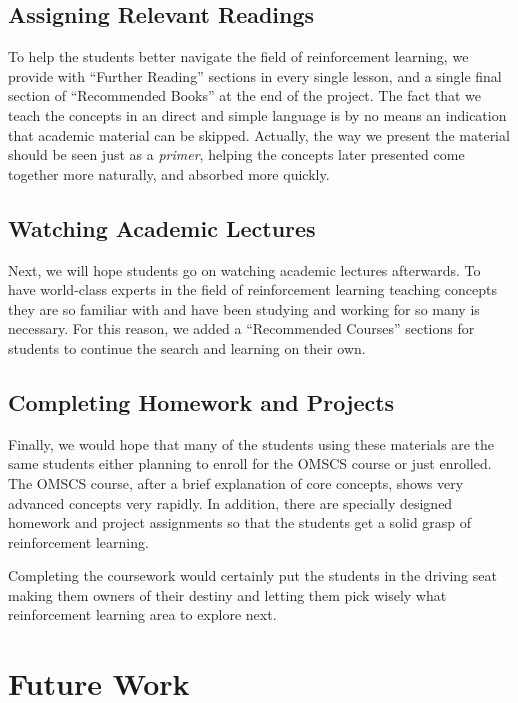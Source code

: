\documentclass[11pt]{article} %
\begin{document}
\subsection{Assigning Relevant Readings}

To help the students better navigate the field of reinforcement learning,
we provide with ``Further Reading'' sections in every single lesson, and a
single final section of ``Recommended Books'' at the end of the project. The fact
that we teach the concepts in an direct and simple language is by no means
an indication that academic material can be skipped. Actually, the way we
present the material should be seen just as a \emph{primer}, helping the
concepts later presented come together more naturally, and absorbed more
quickly.

\subsection{Watching Academic Lectures}

Next, we will hope students go on watching academic lectures afterwards.
To have world-class experts in the field of reinforcement learning teaching
concepts they are so familiar with and have been studying and working for so
many is necessary. For this reason, we added a ``Recommended Courses''
sections for students to continue the search and learning on their own.

\subsection{Completing Homework and Projects}

Finally, we would hope that many of the students using these materials are
the same students either planning to enroll for the OMSCS course or just
enrolled. The OMSCS course, after a brief explanation of core concepts,
shows very advanced concepts very rapidly. In addition, there are specially
designed homework and project assignments so that the students get a solid
grasp of reinforcement learning.

Completing the coursework would certainly put the students in the driving seat
making them owners of their destiny and letting them pick wisely what reinforcement
learning area to explore next. 

\section{Future Work}
\end{document}

